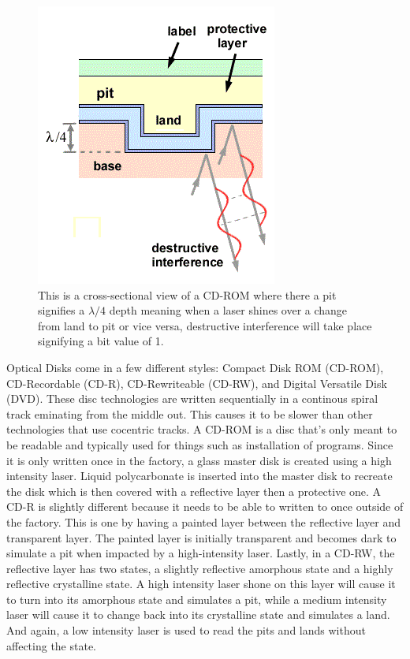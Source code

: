 \documentclass[ notitlepage, numerical, 11pt]{revtex4-1} %
\begin{document}
\begin{figure}[H]
\centerline{\includegraphics[scale=.9]{cdRom.png}}
\caption{ This is a cross-sectional view of a CD-ROM where there a pit signifies a $\lambda/4$ depth meaning when a laser shines over a change from land to pit or vice versa, destructive interference will take place signifying a bit value of 1.}
\label{cdRom}
\end{figure} 
Optical Disks come in a few different styles: Compact Disk ROM (CD-ROM), CD-Recordable (CD-R), CD-Rewriteable (CD-RW), and Digital Versatile Disk (DVD). These disc technologies are written sequentially in a continous spiral track eminating from the middle out. This causes it to be slower than other technologies that use cocentric tracks. A CD-ROM is a disc that's only meant to be readable and typically used for things such as installation of programs. Since it is only written once in the factory, a glass master disk is created using a high intensity laser. Liquid polycarbonate is inserted into the master disk to recreate the disk which is then covered with a reflective layer then a protective one. 
A CD-R is slightly different because it needs to be able to written to once outside of the factory. This is one by having a painted layer between the reflective layer and transparent layer. The painted layer is initially transparent and becomes dark to simulate a pit when impacted by a high-intensity laser. Lastly, in a CD-RW, the reflective layer has two states, a slightly reflective amorphous state and a highly reflective crystalline state. A high intensity laser shone on this layer will cause it to turn into its amorphous state and simulates a pit, while a medium intensity laser will cause it to change back into its crystalline state and simulates a land. And again, a low intensity laser is used to read the pits and lands without affecting the state.
\end{document}
